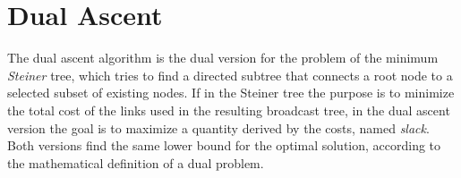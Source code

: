 \chapter{Dual Ascent}\label{ch:dualascent}

The dual ascent algorithm is the dual version for the problem of the minimum
\emph{Steiner} tree, which tries to find a directed subtree that connects a
root node to a selected subset of existing nodes. If in the Steiner tree the
purpose is to minimize the total cost of the links used in the resulting
broadcast tree, in the dual ascent version the goal is to maximize a quantity
derived by the costs, named \emph{slack}. Both versions find the same lower
bound for the optimal solution, according to the mathematical definition of a
dual problem.



